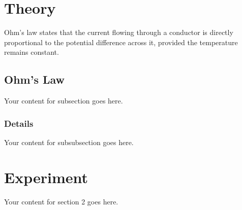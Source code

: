 \documentclass{article}
\begin{document}
\section{Theory}
Ohm's law states that the current flowing through a conductor is directly proportional to the potential difference across it, provided the temperature remains constant.

\subsection{Ohm's Law}
Your content for subsection goes here.

\subsubsection{Details}
Your content for subsubsection goes here.

\section{Experiment}
Your content for section 2 goes here.
\end{document}
